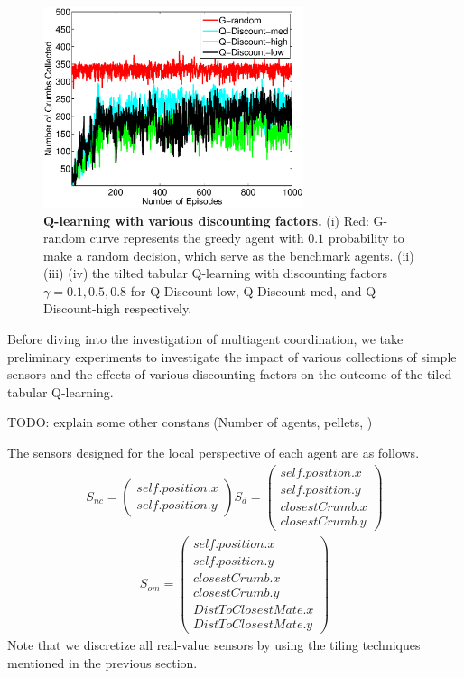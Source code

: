 \documentclass[conference]{IEEEtran}
\begin{document}
\begin{figure}[!t]
\centering
\includegraphics[width=3.0in]{./figures/RL/init_setup2.eps}
\caption{\textbf{Q-learning with various discounting factors.} (i) Red: G-random curve
    represents the greedy agent with $0.1$ probability to make a random
    decision, which serve as the benchmark agents. 
    (ii) (iii) (iv) the tilted tabular Q-learning with discounting factors
    $\gamma = 0.1, 0.5, 0.8$ for Q-Discount-low, Q-Discount-med, and
    Q-Discount-high respectively.}
\label{fig:RL_init2}
\end{figure}

Before diving into the investigation of multiagent coordination, we take 
preliminary experiments to investigate the impact of various collections of
simple sensors and the effects of various discounting factors on the outcome
of the tiled tabular Q-learning.

TODO: explain some other constans (Number of agents, pellets, )


The sensors designed for the local perspective of each agent are as follows. 
\begin{align}
    S_{nc} = \left( \begin{array}{c}
      self.position.x \\
      self.position.y 
  \end{array} \right)
    S_{d} = \left( \begin{array}{c}
      self.position.x \\
      self.position.y \\
      closestCrumb.x \\
      closestCrumb.y 
  \end{array} \right)
    \nonumber
\end{align}
\begin{align}
        S_{om} = \left( \begin{array}{c}
      self.position.x \\
      self.position.y \\
      closestCrumb.x \\
      closestCrumb.y  \\
      DistToClosestMate.x \\
      DistToClosestMate.y 
  \end{array} \right)
        \nonumber
\end{align}
Note that we discretize all real-value sensors by using the tiling
techniques mentioned in the previous section. 
\end{document}
